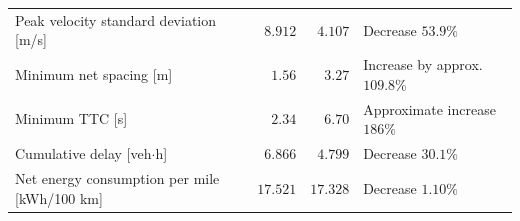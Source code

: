 \documentclass[11pt,a4paper,openany]{book}
\numberwithin{equation}{chapter}
\numberwithin{figure}{chapter}
\numberwithin{table}{chapter}
\begin{document}
\begin{center}
\begin{tabular}{p{4.2cm}rrp{4.4cm}}
\\







Peak velocity standard deviation [m/s]




& $8.912$ & $4.107$ &




 Decrease $53.9\%$



\\







Minimum net spacing [m]




& $1.56$ & $3.27$ &




 Increase by approx. $109.8\%$



\\







Minimum TTC [s]




& $2.34$ & $6.70$ &




 Approximate increase $186\%$



\\







Cumulative delay [veh$\cdot$h]




& $6.866$ & $4.799$ &




 Decrease $30.1\%$



\\







Net energy consumption per mile [kWh/100 km]




& $17.521$ & $17.328$ &




 Decrease $1.10\%$



\\
\bottomrule
\end{tabular}
\end{center}
\end{document}
